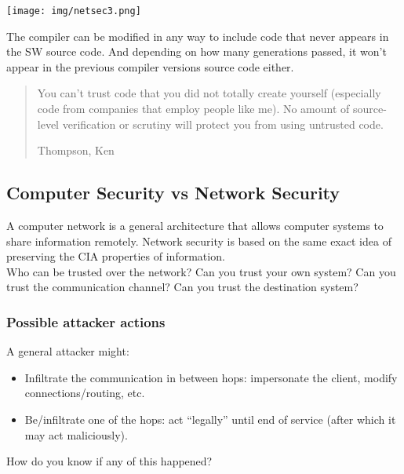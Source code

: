 \documentclass[a4paper, 10pt, titlepage]{article}
\begin{document}
\begin{center}
	\texttt{[image: img/netsec3.png]}
\end{center}
The compiler can be modified in any way to include code that never appears in the SW source code. And depending on how many generations passed, it won’t appear in the previous compiler versions source code either.

\begin{quote}
You can't trust code that you did not totally create yourself (especially code from companies that employ people like me). No amount of source-level verification or scrutiny will protect you from using untrusted code.
\begin{flushright}
Thompson, Ken
\end{flushright}
\end{quote}

\subsection{Computer Security vs Network Security}
A computer network is a general architecture that allows computer systems to share information remotely. Network security is based on the same exact idea of preserving the CIA properties of information. \\
Who can be trusted over the network? 
Can you trust your own system?
Can you trust the communication channel?
Can you trust the destination system?

\subsubsection{Possible attacker actions}
A general attacker might:
\begin{itemize}
\item Infiltrate the communication in between hops: impersonate the client, modify connections/routing, etc.
\item Be/infiltrate one of the hops: act “legally” until end of service (after which it may act maliciously).
\end{itemize}
How do you know if any of this happened?
\end{document}
